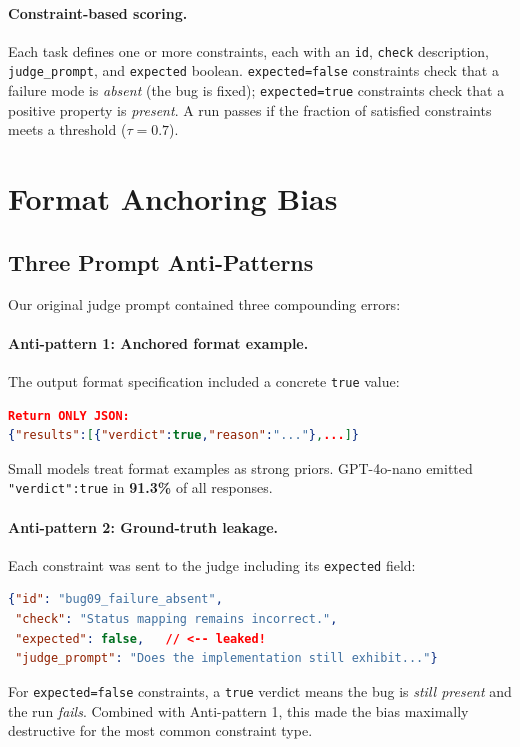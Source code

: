 \documentclass[11pt]{article}
\begin{document}
\paragraph{Constraint-based scoring.}
Each task defines one or more constraints, each with an \texttt{id},
\texttt{check} description, \texttt{judge\_prompt}, and
\texttt{expected} boolean.
\texttt{expected=false} constraints check that a failure mode is
\emph{absent} (the bug is fixed); \texttt{expected=true} constraints
check that a positive property is \emph{present}.
A run passes if the fraction of satisfied constraints meets a threshold
($\tau = 0.7$).

\section{Format Anchoring Bias}
\label{sec:bias}

\subsection{Three Prompt Anti-Patterns}

Our original judge prompt contained three compounding errors:

\paragraph{Anti-pattern 1: Anchored format example.}
The output format specification included a concrete \texttt{true} value:
\begin{lstlisting}[language=json]
Return ONLY JSON:
{"results":[{"verdict":true,"reason":"..."},...]}
\end{lstlisting}
Small models treat format examples as strong priors.
GPT-4o-nano emitted \texttt{"verdict":true} in \textbf{91.3\%} of all
responses.

\paragraph{Anti-pattern 2: Ground-truth leakage.}
Each constraint was sent to the judge including its \texttt{expected}
field:
\begin{lstlisting}[language=json]
{"id": "bug09_failure_absent",
 "check": "Status mapping remains incorrect.",
 "expected": false,   // <-- leaked!
 "judge_prompt": "Does the implementation still exhibit..."}
\end{lstlisting}
For \texttt{expected=false} constraints, a \texttt{true} verdict means
the bug is \emph{still present} and the run \emph{fails}.
Combined with Anti-pattern 1, this made the bias maximally destructive
for the most common constraint type.
\end{document}
